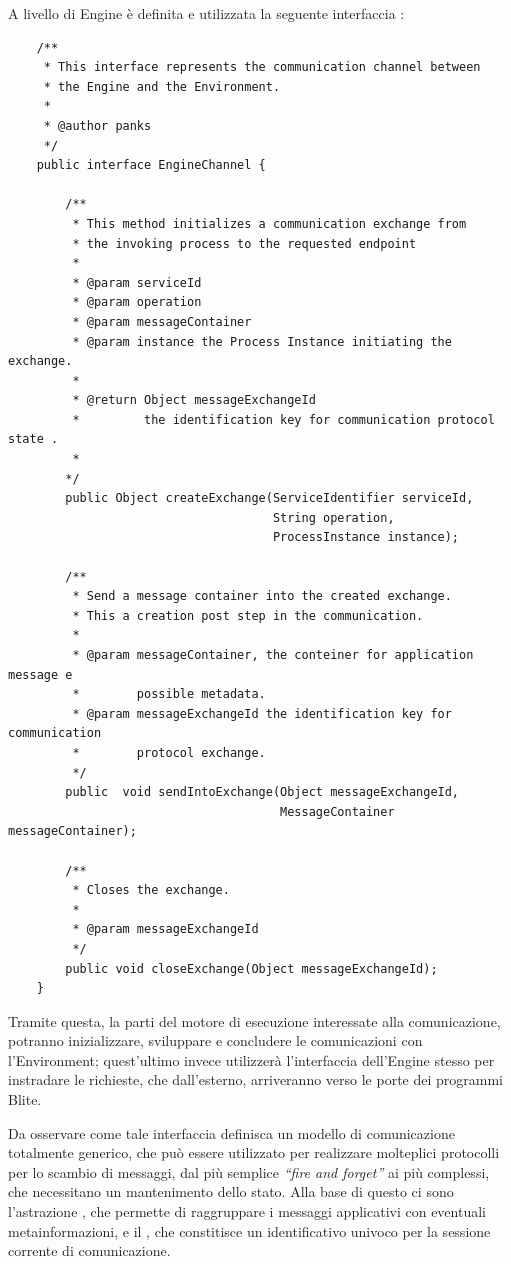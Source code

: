 \begin{enumerate}
  A livello di Engine è definita e utilizzata la seguente interfaccia
  :
  \lstset{frame=NONE}
	\begin{lstlisting}
	/**
	 * This interface represents the communication channel between 
 	 * the Engine and the Environment.  
 	 * 
 	 * @author panks
 	 */
	public interface EngineChannel {
		
   		/**
      	 * This method initializes a communication exchange from 
     	 * the invoking process to the requested endpoint
     	 * 
         * @param serviceId
     	 * @param operation
     	 * @param messageContainer
     	 * @param instance the Process Instance initiating the exchange.
     	 * 
     	 * @return Object messageExchangeId 
     	 *         the identification key for communication protocol state .
     	 *         
     	*/
     	public Object createExchange(ServiceIdentifier serviceId, 
        	                         String operation,
            	                     ProcessInstance instance);
   
    	/**
     	 * Send a message container into the created exchange. 
     	 * This a creation post step in the communication.
     	 * 
     	 * @param messageContainer, the conteiner for application message e
         *        possible metadata.
         * @param messageExchangeId the identification key for communication 
	     *        protocol exchange.
     	 */
    	public  void sendIntoExchange(Object messageExchangeId,
                                      MessageContainer messageContainer);

    	/**
     	 * Closes the exchange.
     	 * 
     	 * @param messageExchangeId
     	 */
    	public void closeExchange(Object messageExchangeId);
	}

  	\end{lstlisting} 

	Tramite questa, la parti del motore di esecuzione interessate alla
	comunicazione, potranno inizializzare, sviluppare e concludere le comunicazioni
	con l'Environment; quest'ultimo invece utilizzerà l'interfaccia dell'Engine
	stesso per instradare le richieste, che dall'esterno, arriveranno verso
	le porte dei programmi Blite.
	
	Da osservare come tale interfaccia definisca un modello di comunicazione
	totalmente generico, che può essere utilizzato per realizzare molteplici
	protocolli per lo scambio di messaggi, dal più semplice \emph{``fire and
	forget''} ai più complessi, che necessitano un mantenimento dello stato.
	Alla base di questo ci sono l'astrazione , che
	permette di raggruppare i messaggi applicativi con eventuali
	metainformazioni, e il , che constitisce un
	identificativo univoco per la sessione corrente di comunicazione.
	

\end{enumerate}

